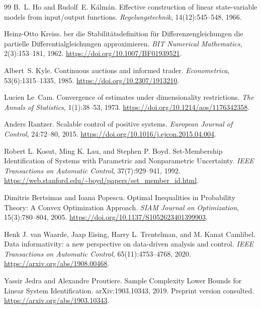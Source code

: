\documentclass[10pt,twocolumn,letterpaper]{article}
\theoremstyle{definition}
\theoremstyle{remark}
\begin{document}
\begin{thebibliography}{99}
B.~L. Ho and Rudolf~E. K{\'a}lm{\'a}n.
\newblock Effective construction of linear state-variable models from input/output functions.
\newblock \emph{Regelungstechnik}, 14(12):545--548, 1966.

Heinz-Otto Kreiss.
ber die {S}tabilit{\"a}tsdefinition f{\"u}r {D}ifferenzengleichungen die partielle {D}ifferentialgleichungen approximieren.
\newblock \emph{BIT Numerical Mathematics}, 2(3):153--181, 1962.
\newblock \url{https://doi.org/10.1007/BF01939521}.

Albert~S. Kyle.
\newblock Continuous auctions and informed trader.
\newblock \emph{Econometrica}, 53(6):1315--1335, 1985.
\newblock \url{https://doi.org/10.2307/1913210}.

Lucien Le~Cam.
\newblock Convergence of estimates under dimensionality restrictions.
\newblock \emph{The Annals of Statistics}, 1(1):38--53, 1973.
\newblock \url{https://doi.org/10.1214/aos/1176342358}.

Anders Rantzer.
\newblock Scalable control of positive systems.
\newblock \emph{European Journal of Control}, 24:72--80, 2015.
\newblock \url{https://doi.org/10.1016/j.ejcon.2015.04.004}.

Robert L. Kosut, Ming K. Lau, and Stephen P. Boyd.
\newblock Set-Membership Identification of Systems with Parametric and Nonparametric Uncertainty.
\newblock \emph{IEEE Transactions on Automatic Control}, 37(7):929--941, 1992.
\newblock \url{https://web.stanford.edu/~boyd/papers/set_member_id.html}.

Dimitris Bertsimas and Ioana Popescu.
\newblock Optimal Inequalities in Probability Theory: A Convex Optimization Approach.
\newblock \emph{SIAM Journal on Optimization}, 15(3):780--804, 2005.
\newblock \url{https://doi.org/10.1137/S1052623401399903}.

Henk J. van Waarde, Jaap Eising, Harry L. Trentelman, and M. Kanat Camlibel.
\newblock Data informativity: a new perspective on data-driven analysis and control.
\newblock \emph{IEEE Transactions on Automatic Control}, 65(11):4753--4768, 2020.
\newblock \url{https://arxiv.org/abs/1908.00468}.

Yassir Jedra and Alexandre Proutiere.
\newblock Sample Complexity Lower Bounds for Linear System Identification.
\newblock arXiv:1903.10343, 2019. Preprint version consulted.
\newblock \url{https://arxiv.org/abs/1903.10343}.


\end{thebibliography}
\end{document}
